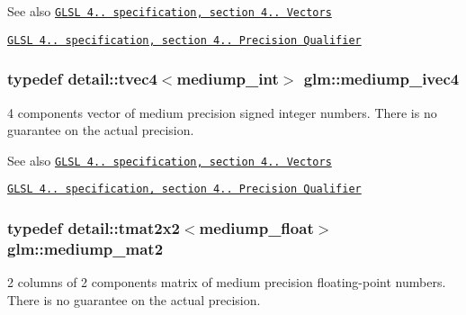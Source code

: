 \begin{DoxySeeAlso}{\-See also}
\href{http://www.opengl.org/registry/doc/GLSLangSpec.4.20.8.pdf}{\tt \-G\-L\-S\-L 4.. specification, section 4.. \-Vectors} 

\href{http://www.opengl.org/registry/doc/GLSLangSpec.4.20.8.pdf}{\tt \-G\-L\-S\-L 4.. specification, section 4.. \-Precision \-Qualifier} 
\end{DoxySeeAlso}
\hypertarget{group__core__precision_gaabd2534479a6e7e493a7362b9f4c63cd}{
\subsubsection[{mediump\-\_\-ivec4}]{\setlength{\rightskip}{0pt plus 5cm}typedef detail\-::tvec4$<$mediump\-\_\-int$>$ {\bf glm\-::mediump\-\_\-ivec4}}}\label{group__core__precision_gaabd2534479a6e7e493a7362b9f4c63cd}
4 components vector of medium precision signed integer numbers. \-There is no guarantee on the actual precision.

\begin{DoxySeeAlso}{\-See also}
\href{http://www.opengl.org/registry/doc/GLSLangSpec.4.20.8.pdf}{\tt \-G\-L\-S\-L 4.. specification, section 4.. \-Vectors} 

\href{http://www.opengl.org/registry/doc/GLSLangSpec.4.20.8.pdf}{\tt \-G\-L\-S\-L 4.. specification, section 4.. \-Precision \-Qualifier} 
\end{DoxySeeAlso}
\hypertarget{group__core__precision_gae67a4f24fb96b68e0f0346ef4212db61}{
\subsubsection[{mediump\-\_\-mat2}]{\setlength{\rightskip}{0pt plus 5cm}typedef detail\-::tmat2x2$<$mediump\-\_\-float$>$ {\bf glm\-::mediump\-\_\-mat2}}}\label{group__core__precision_gae67a4f24fb96b68e0f0346ef4212db61}
2 columns of 2 components matrix of medium precision floating-\/point numbers. \-There is no guarantee on the actual precision.


